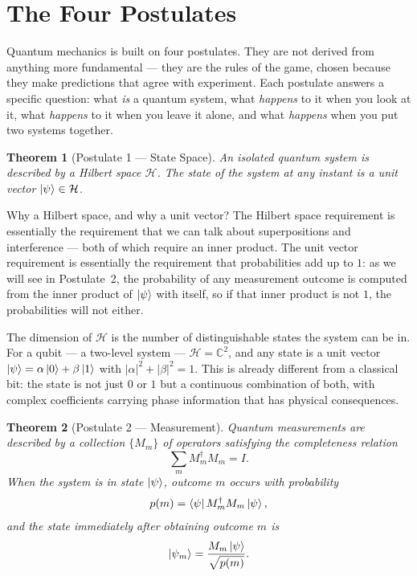 \documentclass[12pt, a4paper, oneside]{report}
\theoremstyle{plain}
\newtheorem{theorem}{Theorem}[chapter]
\theoremstyle{definition}
\theoremstyle{remark}
\newcommand{\Hcal}{\mathcal{H}}
\newcommand{\CC}{\mathbb{C}}
\begin{document}
\section{The Four Postulates}

Quantum mechanics is built on four postulates. They are not derived from anything more
fundamental --- they are the rules of the game, chosen because they make predictions that
agree with experiment. Each postulate answers a specific question: what \emph{is} a quantum
system, what \emph{happens} to it when you look at it, what \emph{happens} to it when you
leave it alone, and what \emph{happens} when you put two systems together.

\begin{theorem}[Postulate 1 --- State Space]
\label{post:state}
An isolated quantum system is described by a Hilbert space $\Hcal$. The state of the system
at any instant is a unit vector $\ket{\psi} \in \Hcal$.
\end{theorem}

Why a Hilbert space, and why a unit vector? The Hilbert space requirement is essentially the
requirement that we can talk about superpositions and interference --- both of which require
an inner product. The unit vector requirement is essentially the requirement that
probabilities add up to $1$: as we will see in Postulate~2, the probability of any
measurement outcome is computed from the inner product of $\ket{\psi}$ with itself, so if
that inner product is not $1$, the probabilities will not either.

The dimension of $\Hcal$ is the number of distinguishable states the system can be in. For
a qubit --- a two-level system --- $\Hcal = \CC^2$, and any state is a unit vector
$\ket{\psi} = \alpha\ket{0} + \beta\ket{1}$ with $|\alpha|^2 + |\beta|^2 = 1$. This is
already different from a classical bit: the state is not just $0$ or $1$ but a continuous
combination of both, with complex coefficients carrying phase information that has physical
consequences.

\begin{theorem}[Postulate 2 --- Measurement]
\label{post:measurement}
Quantum measurements are described by a collection $\{M_m\}$ of operators satisfying the
completeness relation
\[
  \sum_m M_m^\dagger M_m = I.
\]
When the system is in state $\ket{\psi}$, outcome $m$ occurs with probability
\[
  p(m) = \bra{\psi}M_m^\dagger M_m\ket{\psi},
\]
and the state immediately after obtaining outcome $m$ is
\[
  \ket{\psi_m} = \frac{M_m\ket{\psi}}{\sqrt{p(m)}}.
\]
\end{theorem}
\end{document}
